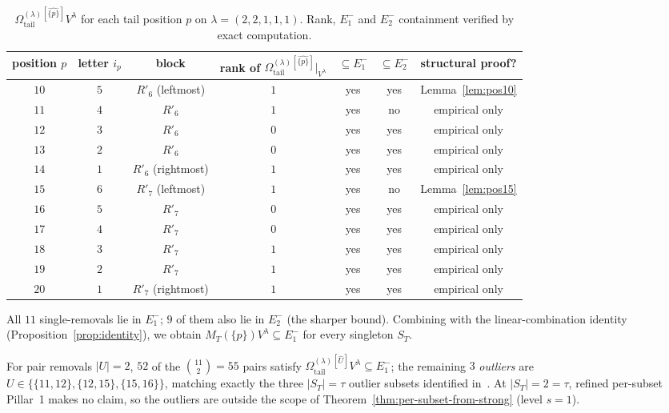 \documentclass[11pt]{article}
\theoremstyle{definition}
\newcommand{\Vlam}{V^\lambda}
\newcommand{\Om}{\Omega}
\newcommand{\Omtail}{\Om^{(\lambda)}_{\mathrm{tail}}}
\newcommand{\Rp}{R'}
\newcommand{\Eminus}[1]{E^-_{#1}}
\begin{document}
\begin{table}[h]
\centering\renewcommand{\arraystretch}{1.2}
\caption{$\Omtail^{[\widehat{\{p\}}]}\Vlam$ for each tail position $p$
on $\lambda = (2,2,1,1,1)$. Rank, $\Eminus 1$ and $\Eminus 2$ containment
verified by exact computation.}
\begin{tabular}{ccccccc}
\toprule
position $p$ & letter $i_p$ & block & rank of $\Omtail^{[\widehat{\{p\}}]}|_{\Vlam}$ & $\subseteq \Eminus 1$ & $\subseteq \Eminus 2$ & structural proof? \\
\midrule
$10$ & $5$ & $\Rp_6$ (leftmost) & $1$ & yes & yes & Lemma~\ref{lem:pos10} \\
$11$ & $4$ & $\Rp_6$ & $1$ & yes & no & empirical only \\
$12$ & $3$ & $\Rp_6$ & $0$ & yes & yes & empirical only \\
$13$ & $2$ & $\Rp_6$ & $0$ & yes & yes & empirical only \\
$14$ & $1$ & $\Rp_6$ (rightmost) & $1$ & yes & yes & empirical only \\
$15$ & $6$ & $\Rp_7$ (leftmost) & $1$ & yes & no & Lemma~\ref{lem:pos15} \\
$16$ & $5$ & $\Rp_7$ & $0$ & yes & yes & empirical only \\
$17$ & $4$ & $\Rp_7$ & $0$ & yes & yes & empirical only \\
$18$ & $3$ & $\Rp_7$ & $1$ & yes & yes & empirical only \\
$19$ & $2$ & $\Rp_7$ & $1$ & yes & yes & empirical only \\
$20$ & $1$ & $\Rp_7$ (rightmost) & $1$ & yes & yes & empirical only \\
\bottomrule
\end{tabular}
\end{table}

All $11$ single-removals lie in $\Eminus 1$; $9$ of them also lie in
$\Eminus 2$ (the sharper bound). Combining with the linear-combination
identity (Proposition~\ref{prop:identity}), we obtain
$M_T(\{p\})\Vlam \subseteq \Eminus 1$ for every singleton $S_T$.

For pair removals $|U| = 2$, $52$ of the $\binom{11}{2} = 55$ pairs satisfy
$\Omtail^{[\widehat U]}\Vlam \subseteq \Eminus 1$; the remaining $3$
\emph{outliers} are $U \in \{\{11,12\}, \{12,15\}, \{15,16\}\}$, matching
exactly the three $|S_T| = \tau$ outlier subsets identified in~\cite{strong}.
At $|S_T| = 2 = \tau$, refined per-subset Pillar~1 makes no claim, so the
outliers are outside the scope of Theorem~\ref{thm:per-subset-from-strong}
(level $s = 1$).
\end{document}
